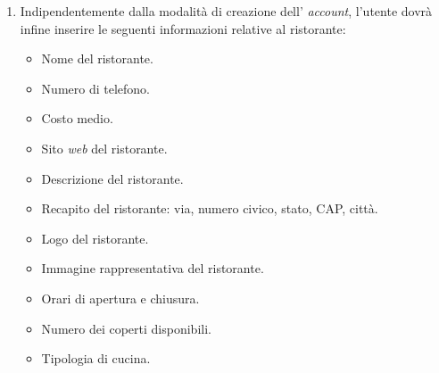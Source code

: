 \begin{itemize}
\begin{enumerate}
            \item Indipendentemente dalla modalità di creazione dell' \textit{account}, l'utente dovrà infine inserire le seguenti informazioni relative al ristorante:
                \begin{itemize}
                    \item Nome del ristorante.
                    \item Numero di telefono.
                    \item Costo medio.
                    \item Sito \textit{web} del ristorante.
                    \item Descrizione del ristorante.
                    \item Recapito del ristorante: via, numero civico, stato, CAP, città.
                    \item Logo del ristorante.
                    \item Immagine rappresentativa del ristorante.
                    \item Orari di apertura e chiusura.
                    \item Numero dei coperti disponibili.
                    \item Tipologia di cucina.
                \end{itemize}
	\end{enumerate}
	
\end{itemize}